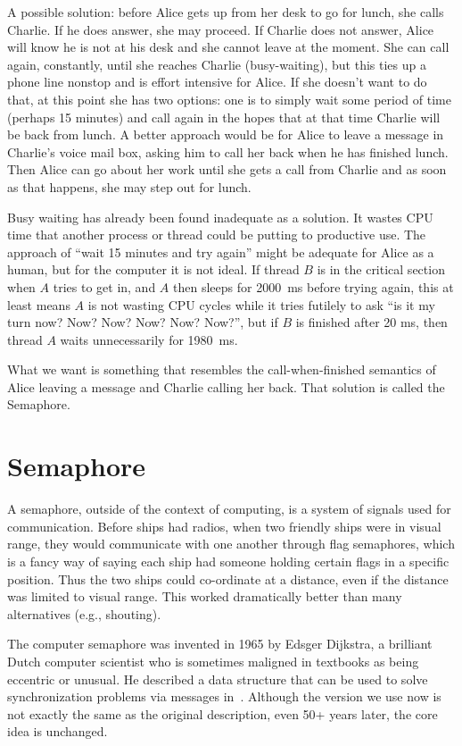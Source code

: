 A possible solution: before Alice gets up from her desk to go for lunch, she calls Charlie. If he does answer, she may proceed. If Charlie does not answer, Alice will know he is not at his desk and she cannot leave at the moment. She can call again, constantly, until she reaches Charlie (busy-waiting), but this ties up a phone line nonstop and is effort intensive for Alice. If she doesn't want to do that, at this point she has two options: one is to simply wait some period of time (perhaps 15 minutes) and call again in the hopes that at that time Charlie will be back from lunch. A better approach would be for Alice to leave a message in Charlie's voice mail box, asking him to call her back when he has finished lunch. Then Alice can go about her work until she gets a call from Charlie and as soon as that happens, she may step out for lunch.

Busy waiting has already been found inadequate as a solution. It wastes CPU time that another process or thread could be putting to productive use. The approach of ``wait 15 minutes and try again'' might be adequate for Alice as a human, but for the computer it is not ideal. If thread $B$ is in the critical section when $A$ tries to get in, and $A$ then sleeps for 2000~ms before trying again, this at least means $A$ is not wasting CPU cycles while it tries futilely to ask ``is it my turn now? Now? Now? Now? Now? Now?'', but if $B$ is finished after 20 ms, then thread $A$ waits unnecessarily for 1980~ms.

What we want is something that resembles the call-when-finished semantics of Alice leaving a message and Charlie calling her back. That solution is called the Semaphore.

\section*{Semaphore}
A semaphore, outside of the context of computing, is a system of signals used for communication. Before ships had radios, when two friendly ships were in visual range, they would communicate with one another through flag semaphores, which is a fancy way of saying each ship had someone holding certain flags in a specific position. Thus the two ships could co-ordinate at a distance, even if the distance was limited to visual range. This worked dramatically better than many alternatives (e.g., shouting).

The computer semaphore was invented in 1965 by Edsger Dijkstra, a brilliant Dutch computer scientist who is sometimes maligned in textbooks as being eccentric or unusual.  He described a data structure that can be used to solve synchronization problems via messages in~\cite{semaphores}. Although the version we use now is not exactly the same as the original description, even 50+ years later, the core idea is unchanged.

